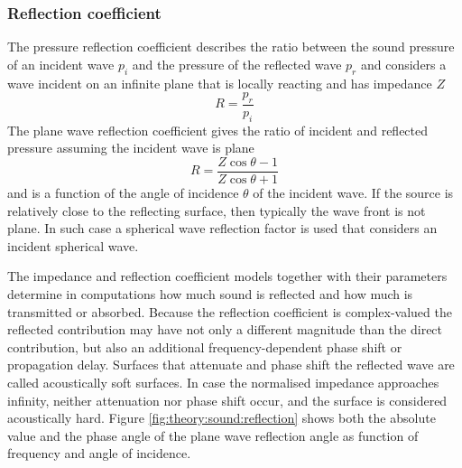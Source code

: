 \subsubsection{Reflection coefficient}
The pressure reflection coefficient describes the ratio between the sound
pressure of an incident wave $p_i$ and the pressure of the reflected wave $p_r$
and considers a wave incident on an infinite plane that is locally
reacting and has impedance $Z$
\begin{equation}
  R = \frac{p_r}{p_i}
\end{equation}
The plane wave reflection coefficient gives the ratio of incident and reflected pressure assuming the incident wave is plane
\begin{equation}\label{eq:theory:sound:reflection:plane}
  R = \frac{Z\cos{\theta}-1}{Z\cos{\theta}+1}
\end{equation}
and is a function of the angle of incidence $\theta$ of the incident wave.
If the source is relatively close to the reflecting surface,
then typically the wave front is not plane. In such case a spherical wave
reflection factor is used that considers an incident spherical wave.

The impedance and reflection coefficient models together with their parameters
determine in computations how much sound is reflected and how much is
transmitted or absorbed. Because the reflection coefficient is complex-valued
the reflected contribution may have not only a different magnitude than the
direct contribution, but also an additional frequency-dependent phase shift or
propagation delay. Surfaces that attenuate and phase shift the reflected wave
are called acoustically soft surfaces. In case the normalised impedance
approaches infinity, neither attenuation nor phase shift occur, and the surface
is considered acoustically hard. Figure \ref{fig:theory:sound:reflection} shows
both the absolute value and the phase angle of the plane wave reflection angle
as function of frequency and angle of incidence.



